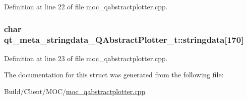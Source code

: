 Definition at line 22 of file moc\+\_\+qabstractplotter.\+cpp.

\hypertarget{structqt__meta__stringdata___q_abstract_plotter__t_a794cda98d9d1ed6e8fb1035d9c2f2216}{}
\subsubsection[{stringdata}]{\setlength{\rightskip}{0pt plus 5cm}char qt\+\_\+meta\+\_\+stringdata\+\_\+\+Q\+Abstract\+Plotter\+\_\+t\+::stringdata\mbox{[}170\mbox{]}}\label{structqt__meta__stringdata___q_abstract_plotter__t_a794cda98d9d1ed6e8fb1035d9c2f2216}


Definition at line 23 of file moc\+\_\+qabstractplotter.\+cpp.



The documentation for this struct was generated from the following file\+:\begin{DoxyCompactItemize}
\item 
Build/\+Client/\+M\+O\+C/\hyperlink{moc__qabstractplotter_8cpp}{moc\+\_\+qabstractplotter.\+cpp}\end{DoxyCompactItemize}
